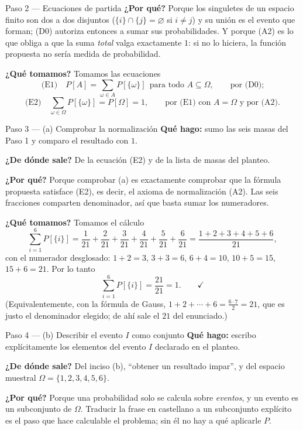 \documentclass[11pt]{article}
\begin{document}
\begin{sol}
\begin{paso}{Paso 2 --- Ecuaciones de partida}
\textbf{¿Por qué?} Porque los singuletes de un espacio finito son dos a dos disjuntos
($\{i\}\cap\{j\}=\varnothing$ si $i\ne j$) y su unión es el evento que forman; (D0) autoriza
entonces a sumar sus probabilidades. Y porque (A2) es lo que obliga a que la suma \emph{total}
valga exactamente $1$: si no lo hiciera, la función propuesta no sería medida de probabilidad.

\textbf{¿Qué tomamos?} Tomamos las ecuaciones
\[
\text{(E1)}\quad P[A]=\sum_{\omega\in A}P[\{\omega\}]\ \ \text{para todo } A\subseteq\Omega,
\qquad\text{por (D0);}
\]
\[
\text{(E2)}\quad \sum_{\omega\in\Omega}P[\{\omega\}]=P[\Omega]=1,
\qquad\text{por (E1) con } A=\Omega \text{ y por (A2).}
\]
\end{paso}

\begin{paso}{Paso 3 --- (a) Comprobar la normalización}
\textbf{Qué hago:} sumo las seis masas del Paso 1 y comparo el resultado con $1$.

\textbf{¿De dónde sale?} De la ecuación (E2) y de la lista de masas del planteo.

\textbf{¿Por qué?} Porque comprobar (a) es exactamente comprobar que la fórmula propuesta
satisface (E2), es decir, el axioma de normalización (A2). Las seis fracciones comparten
denominador, así que basta sumar los numeradores.

\textbf{¿Qué tomamos?} Tomamos el cálculo
\[
\sum_{i=1}^{6}P[\{i\}]
=\frac{1}{21}+\frac{2}{21}+\frac{3}{21}+\frac{4}{21}+\frac{5}{21}+\frac{6}{21}
=\frac{1+2+3+4+5+6}{21},
\]
con el numerador desglosado: $1+2=3$, $3+3=6$, $6+4=10$, $10+5=15$, $15+6=21$. Por lo tanto
\[
\sum_{i=1}^{6}P[\{i\}]=\frac{21}{21}=1 . \qquad\checkmark
\]
(Equivalentemente, con la fórmula de Gauss, $1+2+\cdots+6=\frac{6\cdot 7}{2}=21$, que es justo
el denominador elegido; de ahí sale el $21$ del enunciado.)
\end{paso}

\begin{paso}{Paso 4 --- (b) Describir el evento $I$ como conjunto}
\textbf{Qué hago:} escribo explícitamente los elementos del evento $I$ declarado en el planteo.

\textbf{¿De dónde sale?} Del inciso (b), ``obtener un resultado impar'', y del espacio muestral
$\Omega=\{1,2,3,4,5,6\}$.

\textbf{¿Por qué?} Porque una probabilidad solo se calcula sobre \emph{eventos}, y un evento es
un subconjunto de $\Omega$. Traducir la frase en castellano a un subconjunto explícito es el
paso que hace calculable el problema; sin él no hay a qué aplicarle $P$.


\end{paso}
\end{sol}
\end{document}
